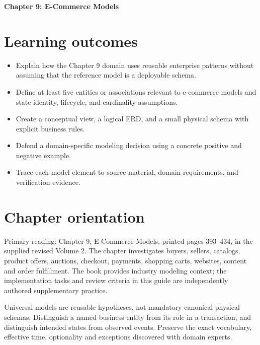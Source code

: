 \documentclass[11pt,letterpaper]{article}
\begin{document}
\begin{center}
{\LARGE\bfseries\color{navy} Chapter 9: E-Commerce Models}\par
\vspace{0.25em}{\large Study guide | concept, critique, design, verify}\par
{}
\end{center}
\vspace{0.8em}
\section{Learning outcomes}
\begin{itemize}
\item Explain how the Chapter 9 domain uses reusable enterprise patterns without assuming that the reference model is a deployable schema.
\item Define at least five entities or associations relevant to e-commerce models and state identity, lifecycle, and cardinality assumptions.
\item Create a conceptual view, a logical ERD, and a small physical schema with explicit business rules.
\item Defend a domain-specific modeling decision using a concrete positive and negative example.
\item Trace each model element to source material, domain requirements, and verification evidence.
\end{itemize}

\section{Chapter orientation}
Primary reading: Chapter 9, E-Commerce Models, printed pages 393--434, in the supplied revised Volume 2. The chapter investigates buyers, sellers, catalogs, product offers, auctions, checkout, payments, shopping carts, websites, content and order fulfillment. The book provides industry modeling context; the implementation tasks and review criteria in this guide are independently authored supplementary practice.

Universal models are reusable hypotheses, not mandatory canonical physical schemas. Distinguish a named business entity from its role in a transaction, and distinguish intended states from observed events. Preserve the exact vocabulary, effective time, optionality and exceptions discovered with domain experts.
\end{document}
